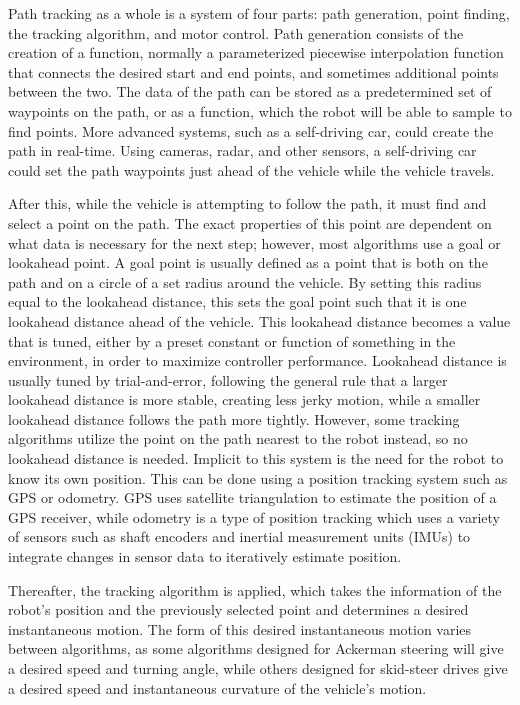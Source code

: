 \documentclass[mla8alt]{mla}
\begin{document}
\begin{paper}
Path tracking as a whole is a system of four parts: path generation, point finding, the tracking algorithm, and motor control. Path generation consists of the creation of a function, normally a parameterized piecewise interpolation function that connects the desired start and end points, and sometimes additional points between the two. The data of the path can be stored as a predetermined set of waypoints on the path, or as a function, which the robot will be able to sample to find points. More advanced systems, such as a self-driving car, could create the path in real-time. Using cameras, radar, and other sensors, a self-driving car could set the path waypoints just ahead of the vehicle while the vehicle travels.

After this, while the vehicle is attempting to follow the path, it must find and select a point on the path. The exact properties of this point are dependent on what data is necessary for the next step; however, most algorithms use a goal or lookahead point. A goal point is usually defined as a point that is both on the path and on a circle of a set radius around the vehicle. By setting this radius equal to the lookahead distance, this sets the goal point such that it is one lookahead distance ahead of the vehicle. This lookahead distance becomes a value that is tuned, either by a preset constant or function of something in the environment, in order to maximize controller performance. Lookahead distance is usually tuned by trial-and-error, following the general rule that a larger lookahead distance is more stable, creating less jerky motion, while a smaller lookahead distance follows the path more tightly. However, some tracking algorithms utilize the point on the path nearest to the robot instead, so no lookahead distance is needed. Implicit to this system is the need for the robot to know its own position. This can be done using a position tracking system such as GPS or odometry. GPS uses satellite triangulation to estimate the position of a GPS receiver, while odometry is a type of position tracking which uses a variety of sensors such as shaft encoders and inertial measurement units (IMUs) to integrate changes in sensor data to iteratively estimate position.

Thereafter, the tracking algorithm is applied, which takes the information of the robot's position and the previously selected point and determines a desired instantaneous motion. The form of this desired instantaneous motion varies between algorithms, as some algorithms designed for Ackerman steering will give a desired speed and turning angle, while others designed for skid-steer drives give a desired speed and instantaneous curvature of the vehicle's motion.


\end{paper}
\end{document}
